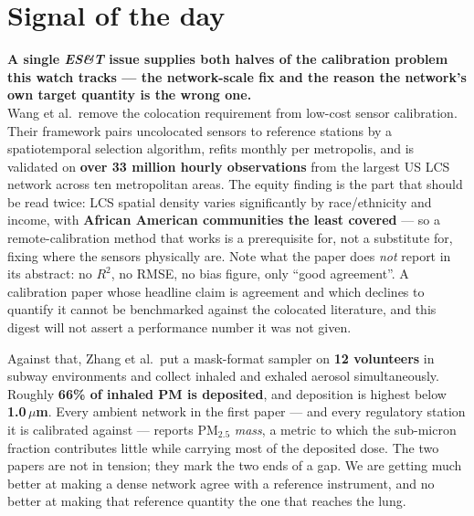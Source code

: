 \documentclass[10pt]{article}
\begin{document}
\vspace{6mm}

\section*{\sffamily\bfseries\color{Deep}Signal of the day}
\vspace{-1.5mm}{\color{Amber}\rule{\linewidth}{1.1pt}}\vspace{2.5mm}

\begin{keybox}
{\sffamily\bfseries\small\color{Deep}A single \textit{ES\&T} issue supplies both halves of
the calibration problem this watch tracks --- the network-scale fix and the reason the
network's own target quantity is the wrong one.}\\[1.4mm]
\footnotesize
Wang et al.\ remove the colocation requirement from low-cost sensor calibration. Their
framework pairs uncolocated sensors to reference stations by a spatiotemporal selection
algorithm, refits monthly per metropolis, and is validated on \textbf{over 33 million
hourly observations} from the largest US LCS network across ten metropolitan areas. The
equity finding is the part that should be read twice: LCS spatial density varies
significantly by race/ethnicity and income, with \textbf{African American communities the
least covered} --- so a remote-calibration method that works is a prerequisite for, not a
substitute for, fixing where the sensors physically are. Note what the paper does
\emph{not} report in its abstract: no $R^2$, no RMSE, no bias figure, only
``good agreement''. A calibration paper whose headline claim is agreement and which
declines to quantify it cannot be benchmarked against the colocated literature, and this
digest will not assert a performance number it was not given.

Against that, Zhang et al.\ put a mask-format sampler on \textbf{12 volunteers} in subway
environments and collect inhaled and exhaled aerosol simultaneously. Roughly
\textbf{66\% of inhaled PM is deposited}, and deposition is highest below
\textbf{1.0\,$\mu$m}. Every ambient network in the first paper --- and every regulatory
station it is calibrated against --- reports PM$_{2.5}$ \emph{mass}, a metric to which the
sub-micron fraction contributes little while carrying most of the deposited dose. The two
papers are not in tension; they mark the two ends of a gap. We are getting much better at
making a dense network agree with a reference instrument, and no better at making that
reference quantity the one that reaches the lung.
\end{keybox}
\end{document}
